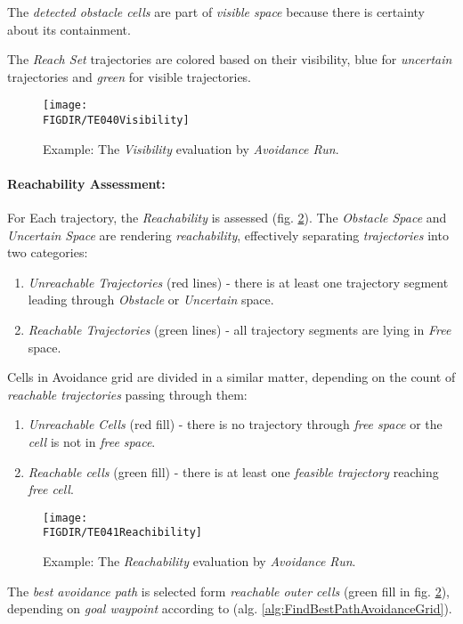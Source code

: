  \begin{note}
     The \emph{detected obstacle cells} are part of \emph{visible space} because there is certainty about its containment.
 \end{note}
 
\noindent The \emph{Reach Set} trajectories are colored based on their visibility, blue for \emph{uncertain} trajectories and \emph{green} for visible trajectories.

\begin{figure}[H]
    \centering
    \texttt{[image: \\FIGDIR/TE040Visibility]}        
    \caption{Example: The \emph{Visibility} evaluation by \emph{Avoidance Run}.}
    \label{fig:exampleVisibilityEvaluation}
\end{figure}

\paragraph{Reachability Assessment:} For Each trajectory, the \emph{Reachability} is assessed (fig. \ref{fig:exampleReachibilityEvaluation}). The \emph{Obstacle Space} and \emph{Uncertain Space} are rendering \emph{reachability}, effectively separating \emph{trajectories} into two categories:

\begin{enumerate}
    \item \emph{Unreachable Trajectories} (red lines) - there is at least one trajectory segment leading through \emph{Obstacle} or \emph{Uncertain} space.
    
    \item \emph{Reachable Trajectories} (green lines) -  all trajectory segments are lying in \emph{Free} space.
\end{enumerate}

\newpage\noindent Cells in Avoidance grid are divided in a similar matter, depending on the count of \emph{reachable trajectories} passing through them:

\begin{enumerate}
    \item \emph{Unreachable Cells} (red fill) - there is no trajectory through \emph{free space} or the \emph{cell} is not in \emph{free space}.
    
    \item \emph{Reachable cells} (green fill) - there is at least one \emph{feasible trajectory} reaching \emph{free cell}.
\end{enumerate}

\begin{figure}[H]
    \centering
    \texttt{[image: \\FIGDIR/TE041Reachibility]}        
    \caption{Example: The \emph{Reachability} evaluation by \emph{Avoidance Run}.}
    \label{fig:exampleReachibilityEvaluation}
\end{figure}

\begin{note}
    The \emph{best avoidance path} is selected form \emph{reachable outer cells} (green fill in fig. \ref{fig:exampleReachibilityEvaluation}), depending on \emph{goal waypoint} according to (alg. \ref{alg:FindBestPathAvoidanceGrid}).
\end{note}

